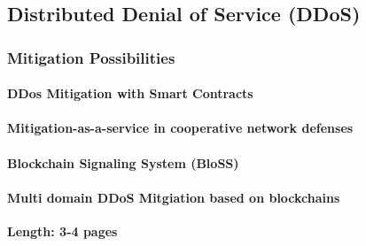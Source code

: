 \subsection{Distributed Denial of Service (DDoS)}
\label{subsec:03_ddos}


\subsubsection{Mitigation Possibilities}


\paragraph{DDos Mitigation with Smart Contracts}
\cite{Rodrigues2017}

\paragraph{Mitigation-as-a-service in cooperative network defenses}
\cite{Mannhart2018}

\paragraph{Blockchain Signaling System (BloSS)}
\cite{Rodrigues2019}

\paragraph{Multi domain DDoS Mitgiation based on blockchains}
\cite{Rodrigues2017a}






\textbf{Length: 3-4 pages}
